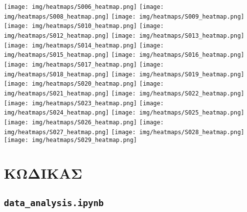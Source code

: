         \begin{multicols}{2} \centering \noindent
            \texttt{[image: img/heatmaps/S006\_heatmap.png]}
            \texttt{[image: img/heatmaps/S008\_heatmap.png]}
            \texttt{[image: img/heatmaps/S009\_heatmap.png]}
            \texttt{[image: img/heatmaps/S010\_heatmap.png]}
            \texttt{[image: img/heatmaps/S012\_heatmap.png]}
            \texttt{[image: img/heatmaps/S013\_heatmap.png]}
            \texttt{[image: img/heatmaps/S014\_heatmap.png]}
            \texttt{[image: img/heatmaps/S015\_heatmap.png]}
            \texttt{[image: img/heatmaps/S016\_heatmap.png]}
            \texttt{[image: img/heatmaps/S017\_heatmap.png]}
            \texttt{[image: img/heatmaps/S018\_heatmap.png]}
            \texttt{[image: img/heatmaps/S019\_heatmap.png]}
            \texttt{[image: img/heatmaps/S020\_heatmap.png]}
            \texttt{[image: img/heatmaps/S021\_heatmap.png]}
            \texttt{[image: img/heatmaps/S022\_heatmap.png]}
            \texttt{[image: img/heatmaps/S023\_heatmap.png]}
            \texttt{[image: img/heatmaps/S024\_heatmap.png]}
            \texttt{[image: img/heatmaps/S025\_heatmap.png]}
            \texttt{[image: img/heatmaps/S026\_heatmap.png]}
            \texttt{[image: img/heatmaps/S027\_heatmap.png]}
            \texttt{[image: img/heatmaps/S028\_heatmap.png]}
            \texttt{[image: img/heatmaps/S029\_heatmap.png]}
        \end{multicols}

    \section{ΚΩΔΙΚΑΣ}
    \subsection{\texttt{data\_analysis.ipynb}}

